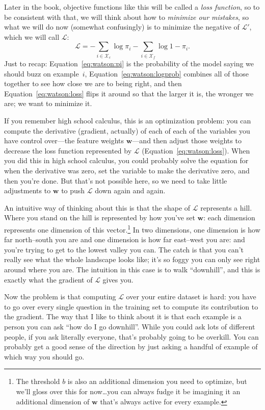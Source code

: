 Later in the book, objective functions like this will be called a \emph{loss
  function}, so to be consistent with that, we will think about how to
\emph{minimize our mistakes}, so what we will do now (somewhat confusingly) is
to minimize the negative of $\mathcal{L}'$, which we will call $\mathcal{L}$:
\begin{equation}
  \mathcal{L} = -\sum_{i \in \mathcal{X}_c}
    \log{\pi_i} - \sum_{i \in
    \mathcal{X}_f} \log{1 - \pi_i}.
  \label{eq:watson:loss}
\end{equation}
Just to recap: Equation~\ref{eq:watson:pi} is the probability of the model
saying we should buzz on example~$i$, Equation~\ref{eq:watson:logprob}
combines all of those together to see how close we are to being right, and
then Equation~\ref{eq:watson:loss} flips it around so that the larger it is,
the wronger we are; we want to minimize it.

If you remember high school calculus, this is an optimization problem: you can
compute the derivative (gradient, actually) of each of each of the variables
you have control over---the feature weights ${\bm w}$---and then adjust those
weights to decrease the loss function represented by $\mathcal{L}$
(Equation~\ref{eq:watson:loss}).
%
When you did this in high school calculus, you could probably solve the
equation for when the derivative was zero, set the variable to make the
derivative zero, and then you're done.
%
But that's not possible here, so we need to take little adjustments to ${\bm
  w}$ to push $\mathcal{L}$ down again and again.

An intuitive way of thinking about this is that the shape of $\mathcal{L}$
represents a hill.
%
Where you stand on the hill is represented by how you've set ${\bm w}$: each
dimension represents one dimension of this vector.\footnote{The threshold $b$
  is also an additional dimension you need to optimize, but we'll gloss over
  this for now\dots you can always fudge it be imagining it an additional
  dimension of ${\bm w}$ that's always active for every example.}
%
In two dimensions, one dimension is how far north--south you are and one
dimension is how far east--west you are: and you're trying to get to the
lowest valley you can.
%
The catch is that you can't really see what the whole landscape looks like;
it's so foggy you can only see right around where you are.
%
The intuition in this case is to walk ``downhill'', and this is exactly what
the gradient of $\mathcal{L}$ gives you.

Now the problem is that computing $\mathcal{L}$ over your entire dataset is
hard: you have to go over every single question in the \jeopardy{} training
set to compute its contribution to the gradient.
%
The way that I like to think about it is that each example is a person you can
ask ``how do I go downhill''.
%
While you could ask lots of different people, if you ask literally everyone,
that's probably going to be overkill.
%
You can probably get a good sense of the direction by just asking a handful of
example of which way you should go.

